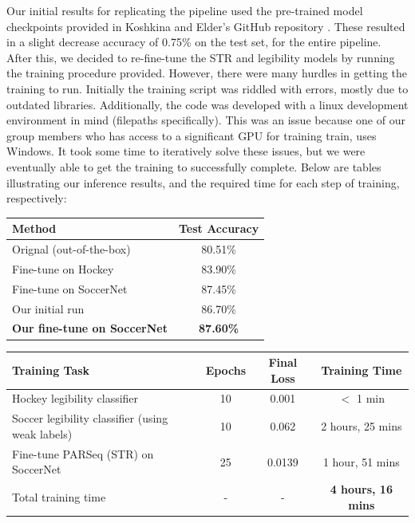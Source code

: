 \documentclass[11pt, letterpaper]{article}
\begin{document}
Our initial results for replicating the pipeline used the pre-trained model checkpoints provided in Koshkina and Elder's GitHub repository \cite{original_pipeline_repo}. These resulted in a slight decrease accuracy of 0.75\% on the test set, for the entire pipeline. After this, we decided to re-fine-tune the STR and legibility models by running the training procedure provided. However, there were many hurdles in getting the training to run. Initially the training script was riddled with errors, mostly due to outdated libraries. Additionally, the code was developed with a linux development environment in mind (filepaths specifically). This was an issue because one of our group members who has access to a significant GPU for training train, uses Windows. It took some time to iteratively solve these issues, but we were eventually able to get the training to successfully complete. Below are tables illustrating our inference results, and the required time for each step of training, respectively: 

\begin{center}
  \begin{tabular}{|l|c|}
    \hline
    \textbf{Method} & \textbf{Test Accuracy} \\
    \hline
    Orignal (out-of-the-box)  & 80.51\% \\
    Fine-tune on Hockey       & 83.90\% \\
    Fine-tune on SoccerNet    & 87.45\%  \\
    \hline
    Our initial run & 86.70\%  \\
    \textbf{Our fine-tune on SoccerNet} & \textbf{87.60\%}  \\
    \hline
  \end{tabular}
\end{center}
\begin{center}
  \begin{tabular}{|l|c|c|c|}
    \hline
    \textbf{Training Task} & \textbf{Epochs} & \textbf{Final Loss} & \textbf{Training Time} \\
    \hline
    Hockey legibility classifier                      & 10 & 0.001 & $<$ 1 min \\
    Soccer legibility classifier (using weak labels)  & 10 & 0.062 & 2 hours, 25 mins \\
    Fine-tune PARSeq (STR) on SoccerNet               & 25 & 0.0139 & 1 hour, 51 mins \\
    \hline
    Total training time & - & - & \textbf{4 hours, 16 mins}  \\
    \hline
  \end{tabular}
\end{center}
\end{document}
